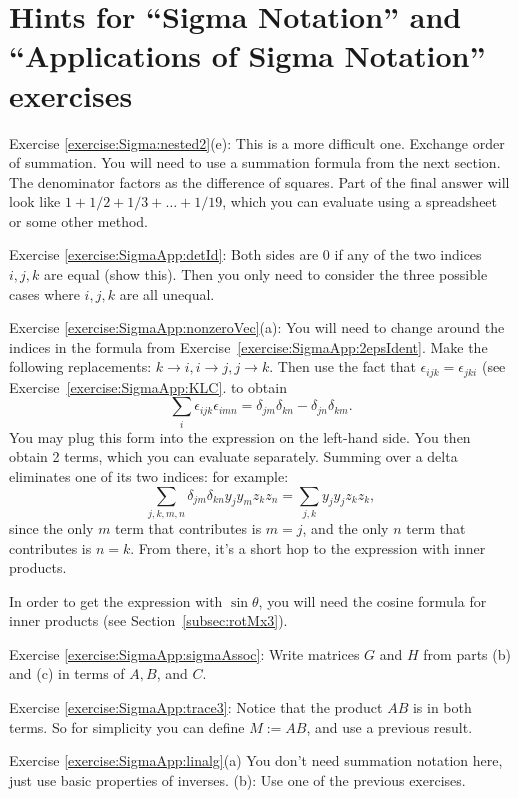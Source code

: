\section{Hints for ``Sigma Notation'' and ``Applications of Sigma Notation''  exercises}\label{sec:sigma:hints} 

\noindent Exercise \ref{exercise:Sigma:nested2}(e): This is a more difficult one.  Exchange order of summation. You will need to use a summation formula from the next section.  The denominator factors as the difference of squares.  Part of the final answer will look like $1 + 1/2 + 1/3 + \ldots + 1/19$, which you can evaluate using a spreadsheet or some other method. 

\noindent Exercise \ref{exercise:SigmaApp:detId}: Both sides are 0 if any of the two indices $i,j,k$ are equal (show this). Then you only need to consider the three possible cases where $i,j,k$ are all unequal.

\noindent Exercise \ref{exercise:SigmaApp:nonzeroVec}(a): You will need to change around the indices in the formula from Exercise~\ref{exercise:SigmaApp:2epsIdent}. Make the following replacements: $k \rightarrow i, i \rightarrow j, j \rightarrow k$.  Then use the fact that $\epsilon_{ijk}= \epsilon_{jki}$ (see Exercise~\ref{exercise:SigmaApp:KLC}.  to obtain
\[\sum_i \epsilon_{ijk} \epsilon_{imn} = \delta_{jm} \delta_{kn} - \delta_{jn} \delta_{km}. \]
You may plug this form into the expression on the left-hand side. You then obtain 2 terms, which you can evaluate separately. Summing over a delta  eliminates one of its two indices: for example:
\[ \sum_{j,k,m,n} \delta_{jm} \delta_{kn}  y_j y_m z_k z_n  = \sum_{j,k} y_j y_j z_k z_k, \]
since the only $m$ term that contributes is $m=j$, and the only $n$ term that contributes is $n=k$. From there, it's a short hop to the expression with inner products.

In order to get the expression with $\sin \theta$, you will need the cosine formula for inner products (see Section~\ref{subsec:rotMx3}).

\noindent Exercise \ref{exercise:SigmaApp:sigmaAssoc}: Write matrices $G$ and $H$ from parts (b) and (c) in terms of $A,B$, and $C$.

\noindent Exercise \ref{exercise:SigmaApp:trace3}: Notice that the product ${AB}$ is in both terms. So for simplicity you can define $M := AB$, and use a previous result.

\noindent Exercise \ref{exercise:SigmaApp:linalg}(a) You don't need summation notation here, just use basic properties of inverses. (b): Use one of the previous exercises.

